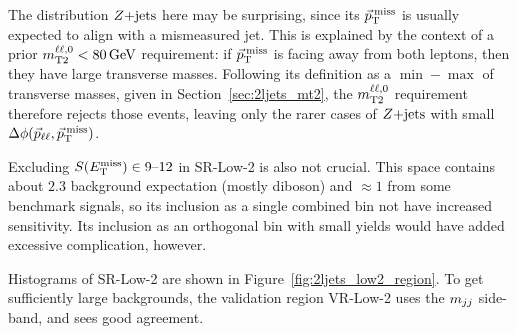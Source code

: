 The distribution $\zjets$ here may be surprising, since its $\ptmiss$ is
usually expected to align with a mismeasured jet.
This is explained by the context of a prior $\mttwoll < 80\,\eV[G]$
requirement:
if $\ptmiss$ is facing away from both leptons, then they have large transverse
masses.
Following its definition as a $\min-\max$ of transverse masses,
given in Section~\ref{sec:2ljets_mt2},
the $\mttwoll$ requirement therefore rejects those events, leaving only the
rarer cases of $\zjets$ with small $\dphillmet$.

Excluding $\metsig \in 9\textrm{--}12$ in SR-Low-2 is also not crucial.
This space contains about $2.3$ background expectation (mostly diboson) and
$\approx 1$ from some benchmark signals, so its inclusion as a single combined
bin not have increased sensitivity.
Its inclusion as an orthogonal bin with small yields would have added excessive
complication, however.

Histograms of SR-Low-2 are shown in Figure~\ref{fig:2ljets_low2_region}.
To get sufficiently large backgrounds, the validation region VR-Low-2 uses
the $\mjj$ side-band, and sees good agreement.


